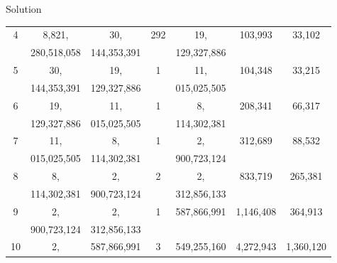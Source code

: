 \begin{vworkexampleparsection}{Solution}
\begin{table}
\begin{center}
\begin{tabular}{|c|c|c|c|c|c|c|}
\hline
\small{4}     & \small{8,821,}            & \small{30,}                & \small{292}     & \small{19,}             & \small{103,993}    & \small{33,102}      \\
              & \small{280,518,058}       & \small{144,353,391}        &                 & \small{129,327,886}     &                    &                     \\
\hline
\small{5}     & \small{30,}               & \small{19,}                & \small{1}       & \small{11,}             & \small{104,348}    & \small{33,215}      \\
              & \small{144,353,391}       & \small{129,327,886}        &                 & \small{015,025,505}     &                    &                     \\
\hline
\small{6}     & \small{19,}               & \small{11,}                & \small{1}       & \small{8,}              & \small{208,341}    & \small{66,317}      \\
              & \small{129,327,886}       & \small{015,025,505}        &                 & \small{114,302,381}     &                    &                     \\
\hline
\small{7}     & \small{11,}               & \small{8,}                 & \small{1}       & \small{2,}              & \small{312,689}    & \small{88,532}      \\
              & \small{015,025,505}       & \small{114,302,381}        &                 & \small{900,723,124}     &                    &                     \\
\hline
\small{8}     & \small{8,}                & \small{2,}                 & \small{2}       & \small{2,}              & \small{833,719}    & \small{265,381}     \\
              & \small{114,302,381}       & \small{900,723,124}        &                 & \small{312,856,133}     &                    &                     \\
\hline
\small{9}     & \small{2,}                & \small{2,}                 & \small{1}       & \small{587,866,991}     & \small{1,146,408}  & \small{364,913}     \\
              & \small{900,723,124}       & \small{312,856,133}        &                 &                         &                    &                     \\
\hline
\small{10}    & \small{2,}                & \small{587,866,991}        & \small{3}       & \small{549,255,160}     & \small{4,272,943}  & \small{1,360,120}   \\

\end{tabular}
\end{center}
\end{table}
\end{vworkexampleparsection}
